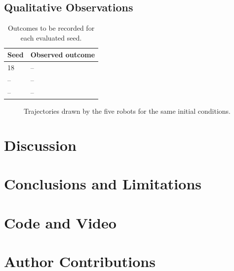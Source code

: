 \documentclass[conference]{IEEEtran}
\begin{document}
\subsection{Qualitative Observations}

\begin{table}[t]
    \centering
    \caption{Outcomes to be recorded for each evaluated seed.}
    \label{tab:seeds}
    \begin{tabular}{ll}
        \toprule
        Seed & Observed outcome \\
        \midrule
        18 & -- \\
        -- & -- \\
        -- & -- \\
        \bottomrule
    \end{tabular}
\end{table}

\begin{figure}[t]
    \centering
    \caption{Trajectories drawn by the five robots for the same initial conditions.}
    \label{fig:trajectories}
\end{figure}

\section{Discussion}

\section{Conclusions and Limitations}

\section*{Code and Video}

\section*{Author Contributions}

\nocite{*}


\end{document}
